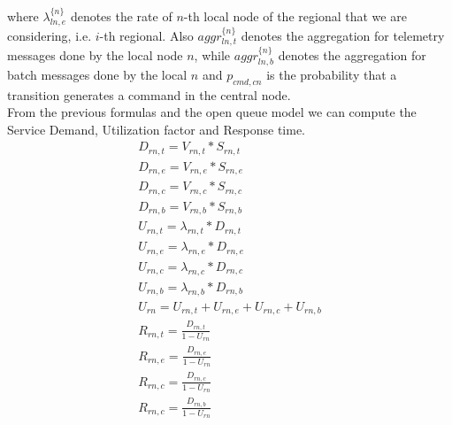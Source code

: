 \documentclass[11pt]{article}
\begin{document}
where $\lambda^{\{ n \}}_{ln, e}$ denotes the rate of $n$-th local node of the regional that we are considering, i.e. $i$-th regional. Also $aggr^{\{n\}}_{ln, t}$ denotes the aggregation for telemetry messages done by the local node $n$, while $aggr^{\{n\}}_{ln,b}$ denotes the aggregation for batch messages done by the local $n$ and $p_{cmd, cn}$ is the probability that a transition generates a command in the central node. \\
From the previous formulas and the open queue model we can compute the Service Demand, Utilization factor and Response time.
\begin{equation}
	\begin{array}{l}
		D_{rn, t} = V_{rn, t} * S_{rn, t} \\
		D_{rn, e} = V_{rn, e} * S_{rn, e} \\
		D_{rn, c} = V_{rn, c} * S_{rn, c} \\
		D_{rn, b} = V_{rn, b} * S_{rn, b} \\
		U_{rn, t} = \lambda_{rn, t} * D_{rn, t} \\
		U_{rn, e} = \lambda_{rn, e} * D_{rn, e} \\
		U_{rn, c} = \lambda_{rn, c} * D_{rn, c} \\
		U_{rn, b} = \lambda_{rn, b} * D_{rn, b} \\
		U_{rn} = U_{rn, t} + U_{rn, e} + U_{rn, c} + U_{rn, b} \\
		R_{rn, t} = \frac{D_{rn, t}}{1 - U_{rn}} \\
		R_{rn, e} = \frac{D_{rn, e}}{1 - U_{rn}} \\
		R_{rn, c} = \frac{D_{rn, c}}{1 - U_{rn}} \\
		R_{rn, c} = \frac{D_{rn, b}}{1 - U_{rn}} \\
	\end{array}
\end{equation}
\end{document}
